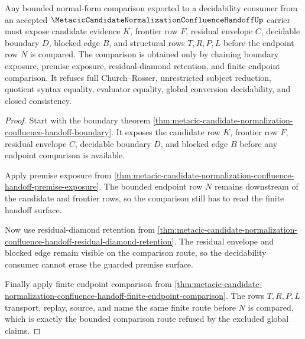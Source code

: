 \begin{theorem}
\label{thm:metacic-candidate-handoff-decidable-normal-form-comparison}
Any bounded normal-form comparison exported to a decidability consumer from an accepted $\MetacicCandidateNormalizationConfluenceHandoffUp$ carrier must expose candidate evidence $K$, frontier row $F$, residual envelope $C$, decidable boundary $D$, blocked edge $B$, and structural rows $T,R,P,L$ before the endpoint row $N$ is compared. The comparison is obtained only by chaining boundary exposure, premise exposure, residual-diamond retention, and finite endpoint comparison. It refuses full Church--Rosser, unrestricted subject reduction, quotient syntax equality, evaluator equality, global conversion decidability, and closed consistency.
\end{theorem}
\begin{proof}
Start with the boundary theorem \autoref{thm:metacic-candidate-normalization-confluence-handoff-boundary}. It exposes the candidate row $K$, frontier row $F$, residual envelope $C$, decidable boundary $D$, and blocked edge $B$ before any endpoint comparison is available.

Apply premise exposure from \autoref{thm:metacic-candidate-normalization-confluence-handoff-premise-exposure}. The bounded endpoint row $N$ remains downstream of the candidate and frontier rows, so the comparison still has to read the finite handoff surface.

Now use residual-diamond retention from \autoref{thm:metacic-candidate-normalization-confluence-handoff-residual-diamond-retention}. The residual envelope and blocked edge remain visible on the comparison route, so the decidability consumer cannot erase the guarded premise surface.

Finally apply finite endpoint comparison from \autoref{thm:metacic-candidate-normalization-confluence-handoff-finite-endpoint-comparison}. The rows $T,R,P,L$ transport, replay, source, and name the same finite route before $N$ is compared, which is exactly the bounded comparison route refused by the excluded global claims.
\end{proof}

